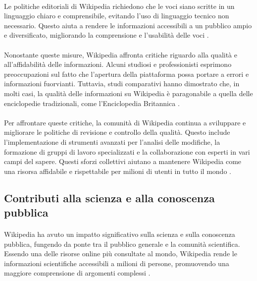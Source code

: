 \documentclass[12pt,a4paper]{report}
\begin{document}
\paragraph*{}
Le politiche editoriali di Wikipedia richiedono che le voci siano scritte in un linguaggio chiaro e comprensibile, evitando l'uso di linguaggio tecnico non necessario. Questo aiuta a rendere le informazioni accessibili a un pubblico ampio e diversificato, migliorando la comprensione e l'usabilità delle voci \cite{reagle2010good}.

\paragraph*{}
Nonostante queste misure, Wikipedia affronta critiche riguardo alla qualità e all'affidabilità delle informazioni. Alcuni studiosi e professionisti esprimono preoccupazioni sul fatto che l'apertura della piattaforma possa portare a errori e informazioni fuorvianti. Tuttavia, studi comparativi hanno dimostrato che, in molti casi, la qualità delle informazioni su Wikipedia è paragonabile a quella delle enciclopedie tradizionali, come l'Enciclopedia Britannica \cite{denning2005wikipedia}.

\paragraph*{}
Per affrontare queste critiche, la comunità di Wikipedia continua a sviluppare e migliorare le politiche di revisione e controllo della qualità. Questo include l'implementazione di strumenti avanzati per l'analisi delle modifiche, la formazione di gruppi di lavoro specializzati e la collaborazione con esperti in vari campi del sapere. Questi sforzi collettivi aiutano a mantenere Wikipedia come una risorsa affidabile e rispettabile per milioni di utenti in tutto il mondo \cite{jemielniak2014wikipedia}.

\subsection{Contributi alla scienza e alla conoscenza pubblica}

\paragraph*{}
Wikipedia ha avuto un impatto significativo sulla scienza e sulla conoscenza pubblica, fungendo da ponte tra il pubblico generale e la comunità scientifica. Essendo una delle risorse online più consultate al mondo, Wikipedia rende le informazioni scientifiche accessibili a milioni di persone, promuovendo una maggiore comprensione di argomenti complessi \cite{reagle2010good}.
\end{document}

